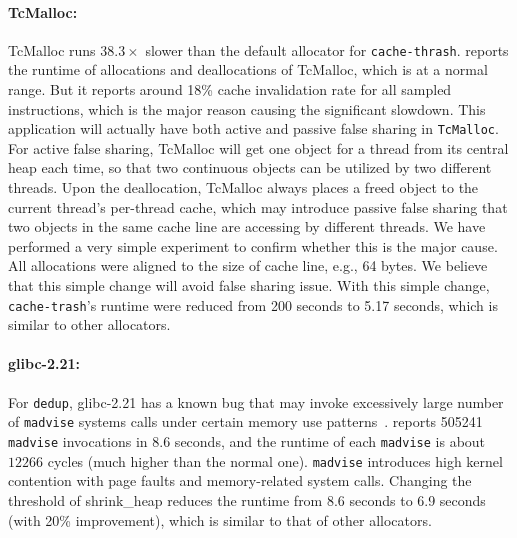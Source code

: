 
\paragraph{TcMalloc:}
TcMalloc runs $38.3\times$ slower than the default allocator for \texttt{cache-thrash}. \MP{} reports the runtime of allocations and deallocations of TcMalloc, which is at a normal range. But it reports around 18\% cache invalidation rate for all sampled instructions, which is the major reason causing the significant slowdown. This application will actually have both active and passive false sharing in \texttt{TcMalloc}. 
For active false sharing, TcMalloc will get one object for a thread from its central heap each time, so that two continuous objects can be utilized by two different threads. Upon the deallocation, TcMalloc always places a freed object to the current thread's per-thread cache, which may introduce passive false sharing that two objects in the same cache line are accessing by different threads. We have performed a very simple experiment to confirm whether this is the major cause. All allocations were aligned to the size of cache line, e.g., 64 bytes. We believe that this simple change will avoid false sharing issue. With this simple change, \texttt{cache-trash}'s runtime were reduced from 200 seconds to 5.17 seconds, which is similar to other allocators. 

\paragraph{glibc-2.21:}  For \texttt{dedup}, glibc-2.21 has a known bug that may invoke excessively large number of \texttt{madvise} systems calls under certain memory use patterns~\cite{madvise}. \MP{} reports 505241 \texttt{madvise} invocations in 8.6 seconds, and the runtime of each \texttt{madvise} is about $12266$ cycles (much higher than the normal one). \texttt{madvise} introduces high kernel contention with page faults and memory-related system calls. Changing the threshold of shrink\_heap reduces the runtime from 8.6 seconds to 6.9 seconds (with 20\% improvement), which is similar to that of other allocators.

